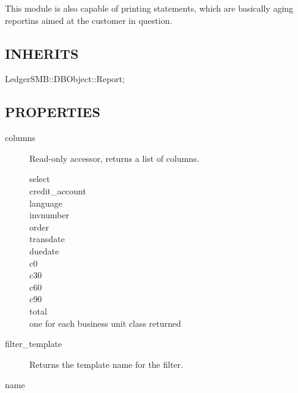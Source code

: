 \begin{description}
\begin{description}
\begin{description}
\begin{description}
\begin{description}
\begin{description}
\begin{description}
\begin{description}
\begin{description}
\begin{description}
This module is also capable of printing statements, which are basically aging
reportins aimed at the customer in question.

\subsection*{INHERITS\label{LedgerSMB::DBObject::Report::Aging_INHERITS}}
\begin{description}

\item[{LedgerSMB::DBObject::Report;}] \mbox{}\end{description}
\subsection*{PROPERTIES\label{LedgerSMB::DBObject::Report::Aging_PROPERTIES}}
\begin{description}

\item[{columns}] \mbox{}

Read-only accessor, returns a list of columns.

\begin{description}

\item[{select}] \mbox{}
\item[{credit\_account}] \mbox{}
\item[{language}] \mbox{}
\item[{invnumber}] \mbox{}
\item[{order}] \mbox{}
\item[{transdate}] \mbox{}
\item[{duedate}] \mbox{}
\item[{c0}] \mbox{}
\item[{c30}] \mbox{}
\item[{c60}] \mbox{}
\item[{c90}] \mbox{}
\item[{total}] \mbox{}
\item[{one for each business unit class returned}] \mbox{}\end{description}

\item[{filter\_template}] \mbox{}

Returns the template name for the filter.


\item[{name}] \mbox{}


\end{description}
\end{description}
\end{description}
\end{description}
\end{description}
\end{description}
\end{description}
\end{description}
\end{description}
\end{description}
\end{description}
